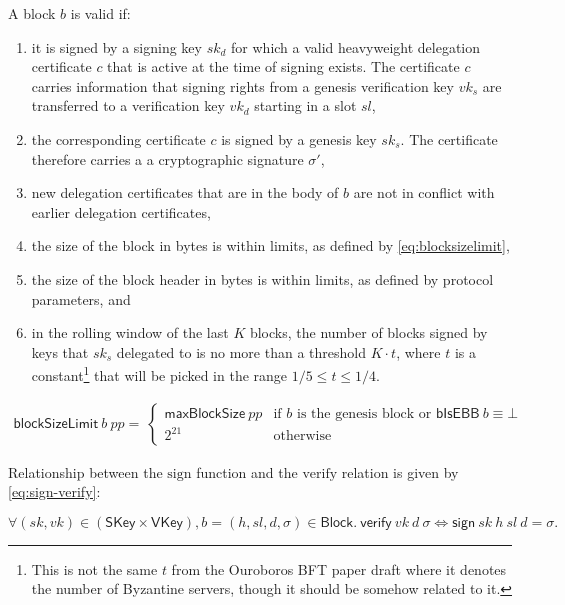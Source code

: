 \documentclass[11pt,a4paper]{article}
\newcommand{\var}[1]{\mathit{#1}}
\newcommand{\fun}[1]{\mathsf{#1}}
\newcommand{\type}[1]{\mathsf{#1}}
\newcommand{\Block}{\type{Block}}
\newcommand{\SKey}{\type{SKey}}
\newcommand{\VKey}{\type{VKey}}
\newcommand{\signname}{sign}
\newcommand{\verifyname}{verify}
\newcommand{\blocksizelimitname}{blockSizeLimit}
\newcommand{\maxblocksizename}{maxBlockSize}
\newcommand{\isebbname}{bIsEBB}
\newcommand{\sign}[4]{\fun{\signname}\ #1 ~ #2 ~ #3 ~ #4}
\newcommand{\verify}[3]{\fun{\verifyname} ~ #1 ~ #2 ~ #3}
\newcommand{\blocksizelimit}[2]{\fun{\blocksizelimitname} ~ #1 ~ #2}
\newcommand{\maxblocksize}[1]{\fun{\maxblocksizename} ~ #1}
\newcommand{\isebb}[1]{\fun{\isebbname} ~ #1}
\begin{document}
A block $\var{b}$ is valid if:
%
\begin{enumerate}
\item it is signed by a signing key $sk_d$ for which a valid heavyweight
  delegation certificate $c$ that is active at the time of signing exists.
  The certificate $c$ carries information that signing rights from a
  genesis verification key $vk_s$ are transferred to a verification key $vk_d$
  starting in a slot $sl$,
\item the corresponding certificate $c$ is signed by a genesis key $sk_s$. The
  certificate therefore carries a a cryptographic signature $\sigma'$,
\item new delegation certificates that are in the body of $b$ are not in
  conflict with earlier delegation certificates,
\item the size of the block in bytes is within limits, as defined by
  \eqref{eq:blocksizelimit},
\item the size of the block header in bytes is within limits, as defined by
  protocol parameters, and
\item in the rolling window of the last $K$ blocks, the number of blocks
  signed by keys that $sk_s$ delegated to is no more than a threshold
  $K \cdot t$, where $t$ is a constant\footnote{This is not the same $t$ from
    the Ouroboros BFT paper draft where it denotes the number of Byzantine
    servers, though it should be somehow related to it.}  that will be picked
  in the range $1/5 \leq t \leq 1/4$.
\end{enumerate}

\begin{align}
  \label{eq:blocksizelimit}
  \blocksizelimit{b}{\var{pp}} = \
  \begin{cases}
    \maxblocksize{\var{pp}} & \text{if $b$ is the genesis block or } \isebb{b} \equiv \bot \\
    2^{21} & \text{otherwise}
  \end{cases}
\end{align}


Relationship between the $\text{\signname}$ function and the
$\text{\verifyname}$ relation is given by \eqref{eq:sign-verify}:

\begin{equation}
  \label{eq:sign-verify}
  \forall (sk, vk) \in (\SKey \times \VKey), b = (h, sl, d, \sigma) \in \Block.\
  \verify{vk}{d}{\sigma} \iff \sign{sk}{h}{sl}{d} = \sigma.
\end{equation}
\end{document}

